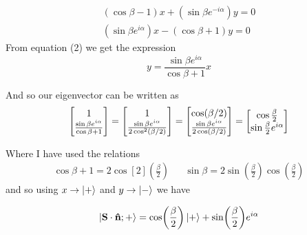 \begin{gather}
    (\cos\beta - 1)x + (\sin\beta e^{-i\alpha})y = 0\\ 
     (\sin\beta e^{i\alpha})x -(\cos\beta + 1)y = 0
\end{gather}
     From equation (2) we get the expression
     \[
     y= \frac{\sin\beta e^{i\alpha}}{\cos\beta+1} x
     \]

     And so our eigenvector can be written as 
     \begin{gather*}
         \mqty[1 \\ \frac{\sin\beta e^{i\alpha}}{\cos\beta+1}] = \mqty[ 1 \\ \frac{\sin\beta e^{i\alpha}}{2\cos[2](\beta/2)}] = \mqty[\cos(\beta/2)\\ \frac{\sin\beta e^{i\alpha}}{2\cos(\beta/2)} ] = \mqty[  \cos\frac\beta2\\ \sin\frac\beta2 e^{i\alpha}  ]
     \end{gather*}

     Where I have used the relations 
     \begin{align*}
         \cos\beta + 1 = 2\cos[2](\frac{\beta}{2}) && \sin\beta = 2\sin(\frac\beta2) \cos(\frac\beta2)
     \end{align*}
     and so using $x \to \ket +$ and $y \to \ket -$ we have 

\[
\ket{\vb S\cdot\vu n;+} = \cos(\frac\beta2) \ket + + \sin(\frac\beta2)e^{i\alpha}
\]
